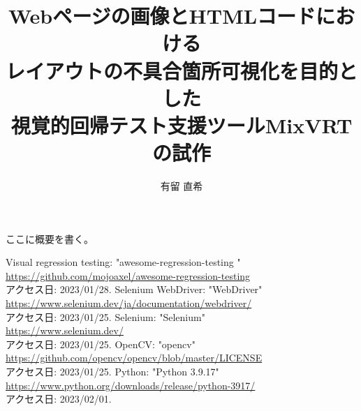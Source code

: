 \documentclass[uplatex, report, a4j, 10pt]{jsbook}
\title{Webページの画像とHTMLコードにおける\\レイアウトの不具合箇所可視化を目的とした\\視覚的回帰テスト支援ツールMixVRTの試作}
\author{有留 直希}
\begin{document}
\maketitle

%
% 
ここに概要を書く。


%
% 








%


%
\begin{thebibliography}{0}
    Visual regression testing: "awesome-regression-testing
    "\\\url{https://github.com/mojoaxel/awesome-regression-testing}\\アクセス日: 2023/01/28.
    Selenium WebDriver: "WebDriver"\\\url{https://www.selenium.dev/ja/documentation/webdriver/}\\アクセス日: 2023/01/25.
    Selenium: "Selenium"\\\url{https://www.selenium.dev/}\\アクセス日: 2023/01/25.
    OpenCV: "opencv"\\\url{https://github.com/opencv/opencv/blob/master/LICENSE}\\アクセス日: 2023/01/25.
    Python: "Python 3.9.17"\\\url{https://www.python.org/downloads/release/python-3917/}\\アクセス日: 2023/02/01.
\end{thebibliography}

\end{document}
